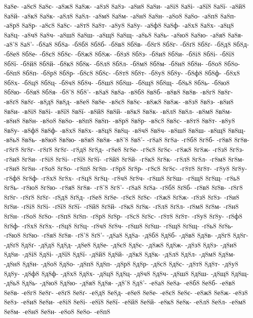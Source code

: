{8а8е-
-а8є8
8а8є-
-а8ж8
8а8ж-
-а8з8
8а8з-
-а8и8
8а8и-
-а8і8
8а8і-
-а8ї8
8а8ї-
-а8й8
8а8й-
-а8к8
8а8к-
-а8л8
8а8л-
-а8м8
8а8м-
-а8н8
8а8н-
-а8о8
8а8о-
-а8п8
8а8п-
-а8р8
8а8р-
-а8с8
8а8с-
-а8т8
8а8т-
-а8у8
8а8у-
-а8ф8
8а8ф-
-а8х8
8а8х-
-а8ц8
8а8ц-
-а8ч8
8а8ч-
-а8ш8
8а8ш-
-а8щ8
8а8щ-
-а8ь8
8а8ь-
-а8ю8
8а8ю-
-а8я8
8а8я-
-а8'8
8а8'-
-б8а8
8б8а-
-б8б8
8б8б-
-б8в8
8б8в-
-б8г8
8б8г-
-б8ґ8
8б8ґ-
-б8д8
8б8д-
-б8е8
8б8е-
-б8є8
8б8є-
-б8ж8
8б8ж-
-б8з8
8б8з-
-б8и8
8б8и-
-б8і8
8б8і-
-б8ї8
8б8ї-
-б8й8
8б8й-
-б8к8
8б8к-
-б8л8
8б8л-
-б8м8
8б8м-
-б8н8
8б8н-
-б8о8
8б8о-
-б8п8
8б8п-
-б8р8
8б8р-
-б8с8
8б8с-
-б8т8
8б8т-
-б8у8
8б8у-
-б8ф8
8б8ф-
-б8х8
8б8х-
-б8ц8
8б8ц-
-б8ч8
8б8ч-
-б8ш8
8б8ш-
-б8щ8
8б8щ-
-б8ь8
8б8ь-
-б8ю8
8б8ю-
-б8я8
8б8я-
-б8'8
8б8'-
-в8а8
8в8а-
-в8б8
8в8б-
-в8в8
8в8в-
-в8г8
8в8г-
-в8ґ8
8в8ґ-
-в8д8
8в8д-
-в8е8
8в8е-
-в8є8
8в8є-
-в8ж8
8в8ж-
-в8з8
8в8з-
-в8и8
8в8и-
-в8і8
8в8і-
-в8ї8
8в8ї-
-в8й8
8в8й-
-в8к8
8в8к-
-в8л8
8в8л-
-в8м8
8в8м-
-в8н8
8в8н-
-в8о8
8в8о-
-в8п8
8в8п-
-в8р8
8в8р-
-в8с8
8в8с-
-в8т8
8в8т-
-в8у8
8в8у-
-в8ф8
8в8ф-
-в8х8
8в8х-
-в8ц8
8в8ц-
-в8ч8
8в8ч-
-в8ш8
8в8ш-
-в8щ8
8в8щ-
-в8ь8
8в8ь-
-в8ю8
8в8ю-
-в8я8
8в8я-
-в8'8
8в8'-
-г8а8
8г8а-
-г8б8
8г8б-
-г8в8
8г8в-
-г8г8
8г8г-
-г8ґ8
8г8ґ-
-г8д8
8г8д-
-г8е8
8г8е-
-г8є8
8г8є-
-г8ж8
8г8ж-
-г8з8
8г8з-
-г8и8
8г8и-
-г8і8
8г8і-
-г8ї8
8г8ї-
-г8й8
8г8й-
-г8к8
8г8к-
-г8л8
8г8л-
-г8м8
8г8м-
-г8н8
8г8н-
-г8о8
8г8о-
-г8п8
8г8п-
-г8р8
8г8р-
-г8с8
8г8с-
-г8т8
8г8т-
-г8у8
8г8у-
-г8ф8
8г8ф-
-г8х8
8г8х-
-г8ц8
8г8ц-
-г8ч8
8г8ч-
-г8ш8
8г8ш-
-г8щ8
8г8щ-
-г8ь8
8г8ь-
-г8ю8
8г8ю-
-г8я8
8г8я-
-г8'8
8г8'-
-ґ8а8
8ґ8а-
-ґ8б8
8ґ8б-
-ґ8в8
8ґ8в-
-ґ8г8
8ґ8г-
-ґ8ґ8
8ґ8ґ-
-ґ8д8
8ґ8д-
-ґ8е8
8ґ8е-
-ґ8є8
8ґ8є-
-ґ8ж8
8ґ8ж-
-ґ8з8
8ґ8з-
-ґ8и8
8ґ8и-
-ґ8і8
8ґ8і-
-ґ8ї8
8ґ8ї-
-ґ8й8
8ґ8й-
-ґ8к8
8ґ8к-
-ґ8л8
8ґ8л-
-ґ8м8
8ґ8м-
-ґ8н8
8ґ8н-
-ґ8о8
8ґ8о-
-ґ8п8
8ґ8п-
-ґ8р8
8ґ8р-
-ґ8с8
8ґ8с-
-ґ8т8
8ґ8т-
-ґ8у8
8ґ8у-
-ґ8ф8
8ґ8ф-
-ґ8х8
8ґ8х-
-ґ8ц8
8ґ8ц-
-ґ8ч8
8ґ8ч-
-ґ8ш8
8ґ8ш-
-ґ8щ8
8ґ8щ-
-ґ8ь8
8ґ8ь-
-ґ8ю8
8ґ8ю-
-ґ8я8
8ґ8я-
-ґ8'8
8ґ8'-
-д8а8
8д8а-
-д8б8
8д8б-
-д8в8
8д8в-
-д8г8
8д8г-
-д8ґ8
8д8ґ-
-д8д8
8д8д-
-д8е8
8д8е-
-д8є8
8д8є-
-д8ж8
8д8ж-
-д8з8
8д8з-
-д8и8
8д8и-
-д8і8
8д8і-
-д8ї8
8д8ї-
-д8й8
8д8й-
-д8к8
8д8к-
-д8л8
8д8л-
-д8м8
8д8м-
-д8н8
8д8н-
-д8о8
8д8о-
-д8п8
8д8п-
-д8р8
8д8р-
-д8с8
8д8с-
-д8т8
8д8т-
-д8у8
8д8у-
-д8ф8
8д8ф-
-д8х8
8д8х-
-д8ц8
8д8ц-
-д8ч8
8д8ч-
-д8ш8
8д8ш-
-д8щ8
8д8щ-
-д8ь8
8д8ь-
-д8ю8
8д8ю-
-д8я8
8д8я-
-д8'8
8д8'-
-е8а8
8е8а-
-е8б8
8е8б-
-е8в8
8е8в-
-е8г8
8е8г-
-е8ґ8
8е8ґ-
-е8д8
8е8д-
-е8е8
8е8е-
-е8є8
8е8є-
-е8ж8
8е8ж-
-е8з8
8е8з-
-е8и8
8е8и-
-е8і8
8е8і-
-е8ї8
8е8ї-
-е8й8
8е8й-
-е8к8
8е8к-
-е8л8
8е8л-
-е8м8
8е8м-
-е8н8
8е8н-
-е8о8
8е8о-
-е8п8
}
